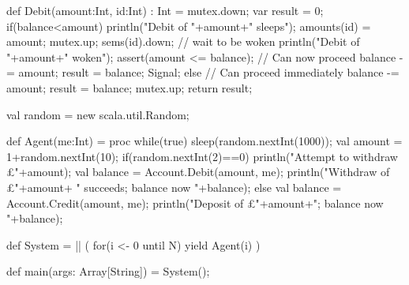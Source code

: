 \begin{answer}
\begin{scala}
{{    def Debit(amount:Int, id:Int) : Int = {
      mutex.down;
      var result = 0;
      if(balance<amount){
	println("Debit of "+amount+" sleeps");
	amounts(id) = amount;
	mutex.up; sems(id).down; // wait to be woken
	println("Debit of "+amount+" woken");
	assert(amount <= balance);
	// Can now proceed
	balance -= amount;
	result = balance;
	Signal;
      }
      else{ // Can proceed immediately
	balance -= amount;
	result = balance;
	mutex.up;
      }
      return result;
    }
  }

  val random = new scala.util.Random;

  def Agent(me:Int) = proc{
    while(true){
      sleep(random.nextInt(1000));
      val amount = 1+random.nextInt(10); 
      if(random.nextInt(2)==0){
	println("Attempt to withdraw £"+amount);
	val balance = Account.Debit(amount, me);
	println("Withdraw of £"+amount+
		" succeeds; balance now "+balance);
      }
      else{
	val balance = Account.Credit(amount, me);
	println("Deposit of £"+amount+"; balance now "+balance);
      }
    }
  }


  def System = || ( for(i <- 0 until N) yield Agent(i) )

  def main(args: Array[String]) = System();
}
\end{scala}
\end{answer}
